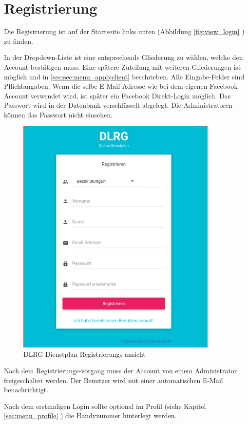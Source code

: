 \chapter{Registrierung}
\label{cha:register}

Die Registrierung ist auf der Startseite links unten (Abbildung  \ref{fig:view_login} \textit{}) zu finden.

\vspace*{5mm} \noindent In der Dropdown-Liste ist eine entsprechende Gliederung zu wählen, welche den Account bestätigen muss. Eine spätere Zuteilung mit weiteren Gliederungen ist möglich und in \ref{sec:sec:menu_applyclient} \textit{} beschrieben. Alle Eingabe-Felder sind Pflichtangaben. Wenn die selbe E-Mail Adresse wie bei dem eigenen Facebook Account verwendet wird, ist später ein Facebook Direkt-Login möglich. Das Passwort wird in der Datenbank verschlüsselt abgelegt. Die Administratoren können das Passwort nicht einsehen.

\begin{figure}[h]
 \begin{addmargin}{-0.2\linewidth}
   \centering 
   \includegraphics[width=10cm]{Bilder/view_register.png}
 \end{addmargin} 
 \caption[Registrierungs ansicht]{DLRG Dienstplan Registrierungs ansicht}
 \label{fig:view_register}
\end{figure}

\vspace*{5mm} \noindent 
Nach dem Registrierungs-vorgang muss der Account von einem Administrator freigeschaltet werden. Der Benutzer wird mit einer automatischen E-Mail benachrichtigt.

\noindent Nach dem erstmaligen Login sollte optional im Profil (siehe Kapitel \ref{sec:menu_profile} \textit{}) die Handynummer hinterlegt werden.